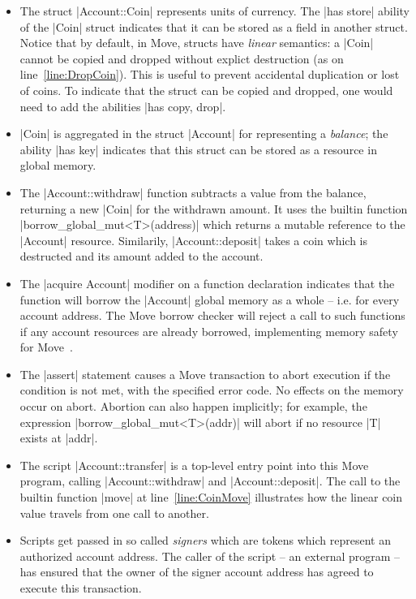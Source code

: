 \begin{itemize}
\item The struct |Account::Coin| represents units of currency. The |has store|
  ability of the |Coin| struct indicates that it can be stored as a field in
  another struct. Notice that by default, in Move, structs have \emph{linear}
  semantics: a |Coin| cannot be copied and dropped without explict destruction
  (as on line~\ref{line:DropCoin}). This is useful to prevent accidental
  duplication or lost of coins. To indicate that the struct can be copied and
  dropped, one would need to add the abilities |has copy, drop|.
\item |Coin| is aggregated in the struct |Account| for representing a
  \emph{balance}; the ability |has key| indicates that this struct can be stored
  as a resource in global memory.
\item The |Account::withdraw| function subtracts a value from the balance,
  returning a new |Coin| for the withdrawn amount.  It uses the builtin function
  |borrow_global_mut<T>(address)| which returns a mutable reference to the
  |Account| resource.  Similarily, |Account::deposit| takes a coin which is
  destructed and its amount added to the account.
\item The |acquire Account| modifier on a function declaration indicates that
  the function will borrow the |Account| global memory as a whole -- i.e. for
  every account address. The Move borrow checker will reject a call to such
  functions if any account resources are already borrowed, implementing memory
  safety for Move~\cite{BORROW_CHECKER}.
\item The |assert| statement causes a Move transaction to abort execution if the
  condition is not met, with the specified error code. No effects on the memory
  occur on abort. Abortion can also happen implicitly; for example, the
  expression |borrow_global_mut<T>(addr)| will abort if no resource |T| exists
  at |addr|.
\item The script |Account::transfer| is a top-level entry point into this Move
  program, calling |Account::withdraw| and |Account::deposit|. The call to the
  builtin function |move| at line~\ref{line:CoinMove} illustrates how the linear
  coin value travels from one call to another.
\item Scripts get passed in so called \emph{signers} which are tokens which
  represent an authorized account address. The caller of the script -- an
  external program -- has ensured that the owner of the signer account address has
  agreed to execute this transaction.
\end{itemize}


